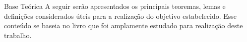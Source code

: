 \begin{frame}{Base Teórica}
    A seguir serão apresentados os principais teoremas, lemas e definições considerados úteis para a realização do objetivo estabelecido. Esse conteúdo se baseia no livro \cite{book:2399854} que foi amplamente estudado para realização deste trabalho.
\end{frame}